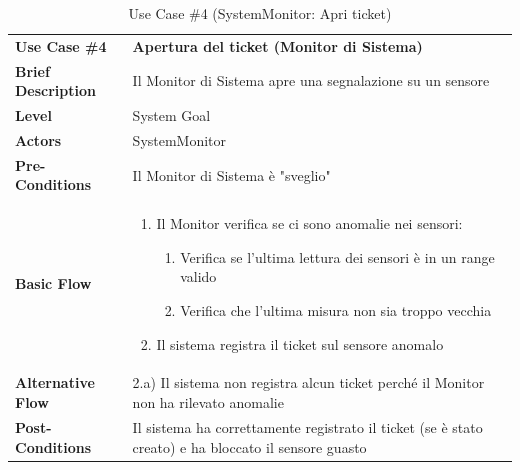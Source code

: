 		\begin{table}[h]
		\centering
		\setlength{\arrayrulewidth}{0.8pt} %
		
		\begin{tabular}{|l p{12cm}|}
			\hline
			
			\rowcolor{gray!25}
			\textbf{Use Case \#4} & \textbf{Apertura del ticket (Monitor di Sistema)} \\ 
			\textbf{Brief Description} & Il Monitor di Sistema apre una segnalazione su un sensore \\
			\textbf{Level} & System Goal\\ 
			\textbf{Actors} & SystemMonitor \\ 
			\textbf{Pre-Conditions} & Il Monitor di Sistema è "sveglio" \\ 
			\textbf{Basic Flow} & \begin{enumerate}[label=\arabic*), leftmargin=*, before=\vspace{-0.7cm}, after=\vspace{-0.4cm}]
				\item Il Monitor verifica se ci sono anomalie nei sensori:
				 \begin{enumerate}[label=\arabic*), leftmargin=*, before=\vspace{-0.3cm}, after=\vspace{-0.3cm}]
					\item[1.a)] Verifica se l'ultima lettura dei sensori è in un range valido
					\item[1.b)] Verifica che l'ultima misura non sia troppo vecchia
				\end{enumerate}   
				\item Il sistema registra il ticket sul sensore anomalo
			\end{enumerate} \\  
			\textbf{Alternative Flow} & 2.a) Il sistema non registra alcun ticket perché il Monitor non ha rilevato anomalie \\ 
			\textbf{Post-Conditions} & Il sistema ha correttamente registrato il ticket (se è stato creato) e ha bloccato il sensore guasto\\ 
			
			\hline
		\end{tabular}
		
		\vspace{0.2cm}
		\caption{Use Case \#4 (SystemMonitor: Apri ticket)}
	\end{table}
	\vspace{1cm} 
	

